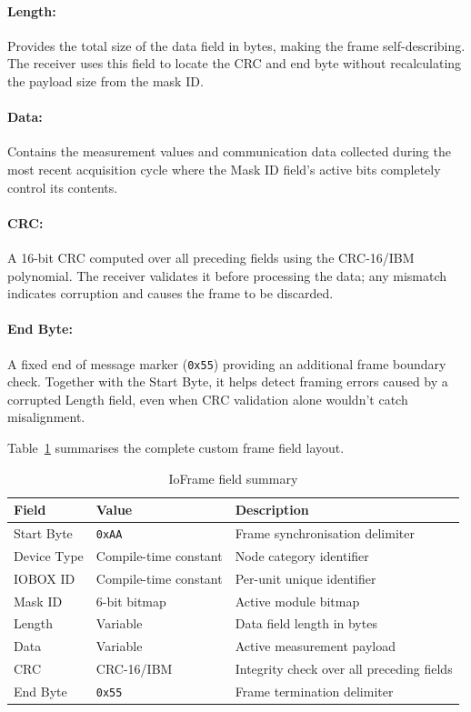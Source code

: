 \paragraph{Length:}
Provides the total size of the data field in bytes, making the frame self-describing. The receiver uses this field to locate the CRC and end byte without recalculating the payload size from the mask ID.

\paragraph{Data:}
Contains the measurement values and communication data collected during the most recent acquisition cycle where the Mask ID field's active bits completely control its contents.

\paragraph{CRC:}
A 16-bit CRC computed over all preceding fields using the CRC-16/IBM polynomial. The receiver validates it before processing the data; any mismatch indicates corruption and causes the frame to be discarded.

\paragraph{End Byte:}
A fixed end of message marker (\texttt{0x55}) providing an additional frame boundary check. Together with the Start Byte, it helps detect framing errors caused by a corrupted Length field, even when CRC validation alone wouldn't catch misalignment.

Table~\ref{tab:ioframe_fields} summarises the complete custom frame field layout.
\begin{table}[H]
    \centering
    \caption{IoFrame field summary}
    \label{tab:ioframe_fields}
    \begin{tabular}{|l|l|p{6.5cm}|}
        \hline
        \textbf{Field} & \textbf{Value} & \textbf{Description} \\
        \hline
        Start Byte  & \texttt{0xAA}    & Frame synchronisation delimiter \\
        \hline
        Device Type & Compile-time constant & Node category identifier \\
        \hline
        IOBOX ID    & Compile-time constant & Per-unit unique identifier \\
        \hline
        Mask ID     & 6-bit bitmap     & Active module bitmap \\
        \hline
        Length      & Variable         & Data field length in bytes \\
        \hline
        Data        & Variable         & Active measurement payload \\
        \hline
        CRC         & CRC-16/IBM       & Integrity check over all preceding fields \\
        \hline
        End Byte    & \texttt{0x55}    & Frame termination delimiter \\
        \hline
    \end{tabular}
\end{table}

